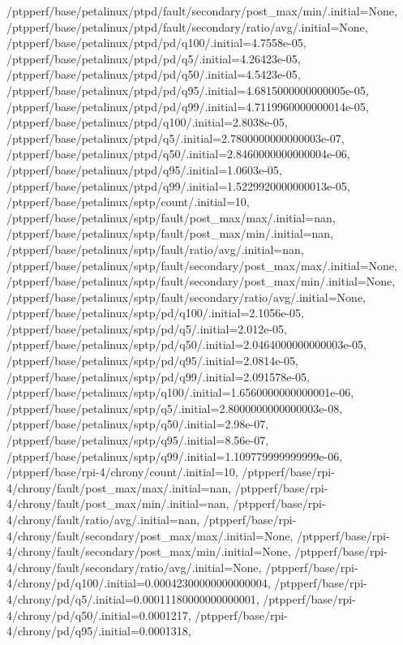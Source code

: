 {    /ptpperf/base/petalinux/ptpd/fault/secondary/post_max/min/.initial=None,
    /ptpperf/base/petalinux/ptpd/fault/secondary/ratio/avg/.initial=None,
    /ptpperf/base/petalinux/ptpd/pd/q100/.initial=4.7558e-05,
    /ptpperf/base/petalinux/ptpd/pd/q5/.initial=4.26423e-05,
    /ptpperf/base/petalinux/ptpd/pd/q50/.initial=4.5423e-05,
    /ptpperf/base/petalinux/ptpd/pd/q95/.initial=4.6815000000000005e-05,
    /ptpperf/base/petalinux/ptpd/pd/q99/.initial=4.7119960000000014e-05,
    /ptpperf/base/petalinux/ptpd/q100/.initial=2.8038e-05,
    /ptpperf/base/petalinux/ptpd/q5/.initial=2.7800000000000003e-07,
    /ptpperf/base/petalinux/ptpd/q50/.initial=2.8460000000000004e-06,
    /ptpperf/base/petalinux/ptpd/q95/.initial=1.0603e-05,
    /ptpperf/base/petalinux/ptpd/q99/.initial=1.5229920000000013e-05,
    /ptpperf/base/petalinux/sptp/count/.initial=10,
    /ptpperf/base/petalinux/sptp/fault/post_max/max/.initial=nan,
    /ptpperf/base/petalinux/sptp/fault/post_max/min/.initial=nan,
    /ptpperf/base/petalinux/sptp/fault/ratio/avg/.initial=nan,
    /ptpperf/base/petalinux/sptp/fault/secondary/post_max/max/.initial=None,
    /ptpperf/base/petalinux/sptp/fault/secondary/post_max/min/.initial=None,
    /ptpperf/base/petalinux/sptp/fault/secondary/ratio/avg/.initial=None,
    /ptpperf/base/petalinux/sptp/pd/q100/.initial=2.1056e-05,
    /ptpperf/base/petalinux/sptp/pd/q5/.initial=2.012e-05,
    /ptpperf/base/petalinux/sptp/pd/q50/.initial=2.0464000000000003e-05,
    /ptpperf/base/petalinux/sptp/pd/q95/.initial=2.0814e-05,
    /ptpperf/base/petalinux/sptp/pd/q99/.initial=2.091578e-05,
    /ptpperf/base/petalinux/sptp/q100/.initial=1.6560000000000001e-06,
    /ptpperf/base/petalinux/sptp/q5/.initial=2.8000000000000003e-08,
    /ptpperf/base/petalinux/sptp/q50/.initial=2.98e-07,
    /ptpperf/base/petalinux/sptp/q95/.initial=8.56e-07,
    /ptpperf/base/petalinux/sptp/q99/.initial=1.109779999999999e-06,
    /ptpperf/base/rpi-4/chrony/count/.initial=10,
    /ptpperf/base/rpi-4/chrony/fault/post_max/max/.initial=nan,
    /ptpperf/base/rpi-4/chrony/fault/post_max/min/.initial=nan,
    /ptpperf/base/rpi-4/chrony/fault/ratio/avg/.initial=nan,
    /ptpperf/base/rpi-4/chrony/fault/secondary/post_max/max/.initial=None,
    /ptpperf/base/rpi-4/chrony/fault/secondary/post_max/min/.initial=None,
    /ptpperf/base/rpi-4/chrony/fault/secondary/ratio/avg/.initial=None,
    /ptpperf/base/rpi-4/chrony/pd/q100/.initial=0.00042300000000000004,
    /ptpperf/base/rpi-4/chrony/pd/q5/.initial=0.00011180000000000001,
    /ptpperf/base/rpi-4/chrony/pd/q50/.initial=0.0001217,
    /ptpperf/base/rpi-4/chrony/pd/q95/.initial=0.0001318,
}
